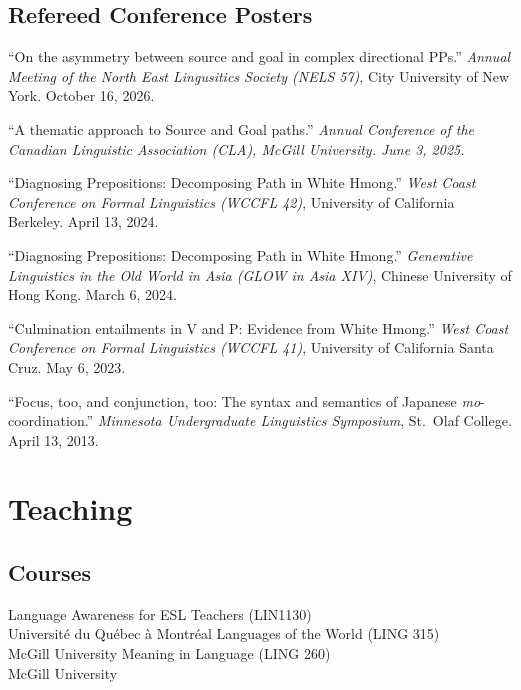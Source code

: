 \documentclass[11pt,oneside,letterpaper]{johnstoncv}
\begin{document}
\begin{entries}
\subsection{Refereed Conference Posters}

\Pub ``On the asymmetry between source and goal in complex directional PPs.'' \textit{Annual Meeting of the North East Lingusitics Society (NELS 57)}, City University of New York. October 16, 2026.

\Pub ``A thematic approach to Source and Goal paths.'' \textit{Annual Conference of the Canadian Linguistic Association (CLA), McGill University. June 3, 2025.}

\Pub ``Diagnosing Prepositions: Decomposing Path in White Hmong.'' \textit{West Coast Conference on Formal Linguistics (WCCFL 42)}, University of California Berkeley. April 13, 2024.

\Pub ``Diagnosing Prepositions: Decomposing Path in White Hmong.'' \textit{Generative Linguistics in the Old World in Asia (GLOW in Asia XIV)}, Chinese University of Hong Kong. March 6, 2024.

\Pub ``Culmination entailments in V and P: Evidence from White Hmong.'' \textit{West Coast Conference on Formal Linguistics (WCCFL 41)}, University of California Santa Cruz. May 6, 2023.

\Pub ``Focus, too, and conjunction, too: The syntax and semantics of Japanese \textit{mo}-coordination.'' \textit{Minnesota Undergraduate Linguistics Symposium}, St.\ Olaf College. April 13, 2013.

\section{Teaching}

\subsection{Courses}
\Item[2024]	Language Awareness for ESL Teachers (LIN1130)\\ Université du Québec à Montréal
\Item[2023]	Languages of the World (LING 315)\\ McGill University
\Item[2021]	Meaning in Language (LING 260)\\ McGill University


\end{entries}
\end{document}
